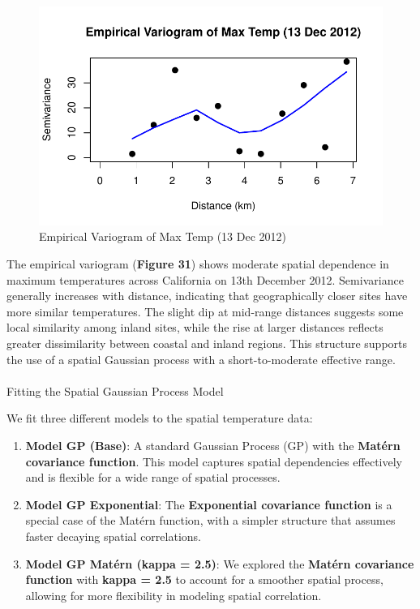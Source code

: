 \documentclass[
  11pt,
]{article}
\makeatletter
\let\oldparagraph\paragraph
\renewcommand{\paragraph}{
    \@ifstar
      \xxxParagraphStar
      \xxxParagraphNoStar
  }
\newcommand{\xxxParagraphStar}[1]{\oldparagraph*{#1}\mbox{}}
\newcommand{\xxxParagraphNoStar}[1]{\oldparagraph{#1}\mbox{}}
\providecommand{\tightlist}{%
  \setlength{\itemsep}{0pt}\setlength{\parskip}{0pt}}\usepackage{longtable,booktabs,array}
\makeatother
\begin{document}
\begin{figure}[H]

{\centering \includegraphics{project_files/figure-pdf/fig-1234-1.pdf}

}

\caption{Empirical Variogram of Max Temp (13 Dec 2012)}

\end{figure}%

The empirical variogram (\textbf{Figure 31}) shows moderate spatial
dependence in maximum temperatures across California on 13th December
2012. Semivariance generally increases with distance, indicating that
geographically closer sites have more similar temperatures. The slight
dip at mid-range distances suggests some local similarity among inland
sites, while the rise at larger distances reflects greater dissimilarity
between coastal and inland regions. This structure supports the use of a
spatial Gaussian process with a short-to-moderate effective range.

\paragraph{Fitting the Spatial Gaussian Process
Model}\label{fitting-the-spatial-gaussian-process-model}

We fit three different models to the spatial temperature data:

\begin{enumerate}
\def\labelenumi{\arabic{enumi}.}
\tightlist
\item
  \textbf{Model GP (Base)}: A standard Gaussian Process (GP) with the
  \textbf{Matérn covariance function}. This model captures spatial
  dependencies effectively and is flexible for a wide range of spatial
  processes.
\item
  \textbf{Model GP Exponential}: The \textbf{Exponential covariance
  function} is a special case of the Matérn function, with a simpler
  structure that assumes faster decaying spatial correlations.
\item
  \textbf{Model GP Matérn (kappa = 2.5)}: We explored the \textbf{Matérn
  covariance function} with \textbf{kappa = 2.5} to account for a
  smoother spatial process, allowing for more flexibility in modeling
  spatial correlation.
\end{enumerate}
\end{document}
